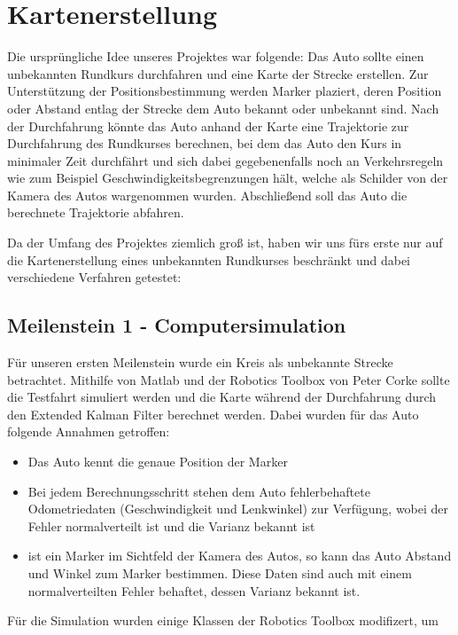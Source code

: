 \section{Kartenerstellung}

Die ursprüngliche Idee unseres Projektes war folgende: Das Auto sollte einen unbekannten Rundkurs durchfahren und eine Karte der Strecke erstellen. Zur Unterstützung der Positionsbestimmung werden Marker plaziert, deren Position oder Abstand entlag der Strecke dem Auto bekannt oder unbekannt sind.
Nach der Durchfahrung könnte das Auto anhand der Karte eine Trajektorie zur Durchfahrung des Rundkurses berechnen, bei dem das Auto den Kurs in minimaler Zeit durchfährt und sich dabei gegebenenfalls noch an Verkehrsregeln wie zum Beispiel Geschwindigkeitsbegrenzungen hält, welche als Schilder von der Kamera des Autos wargenommen wurden.
Abschließend soll das Auto die berechnete Trajektorie abfahren.

Da der Umfang des Projektes ziemlich groß ist, haben wir uns fürs erste nur auf die Kartenerstellung eines unbekannten Rundkurses beschränkt und dabei verschiedene Verfahren getestet:

\subsection{Meilenstein 1 - Computersimulation}

Für unseren ersten Meilenstein wurde ein Kreis als unbekannte Strecke betrachtet. Mithilfe von Matlab und der Robotics Toolbox von Peter Corke sollte die Testfahrt simuliert werden und die Karte während der Durchfahrung durch den Extended Kalman Filter berechnet werden.
Dabei wurden für das Auto folgende Annahmen getroffen:
\begin{itemize}
 	\item Das Auto kennt die genaue Position der Marker
 	\item Bei jedem Berechnungsschritt stehen dem Auto fehlerbehaftete Odometriedaten (Geschwindigkeit und Lenkwinkel) zur Verfügung, wobei der Fehler normalverteilt ist und die Varianz bekannt ist
 	\item ist ein Marker im Sichtfeld der Kamera des Autos, so kann das Auto Abstand und Winkel zum Marker bestimmen. Diese Daten sind auch mit einem normalverteilten Fehler behaftet, dessen Varianz bekannt ist.
\end{itemize}
Für die Simulation wurden einige Klassen der Robotics Toolbox modifizert, um 


